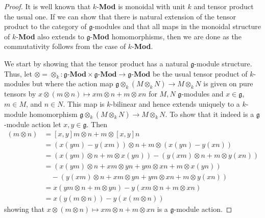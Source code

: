 \begin{proof}
  It is well known that $ k $-\textbf{Mod} is monoidal with unit $ k $ and tensor product the usual one. If we can show that there is natural extension of the tensor product to the category of $ \mathfrak{g} $-modules and that all maps in the monoidal structure of $ k $-\textbf{Mod} also extends to $ \mathfrak{g} $-\textbf{Mod} homomorphisms, then we are done as the commutativity follows from the case of $ k $-\textbf{Mod}.

  We start by showing that the tensor product has a natural $ \mathfrak{g} $-module structure. Thus, let $ \otimes = \otimes_k:\mathfrak{g}\text{-}\mathbf{Mod} \times \mathfrak{g}\text{-}\mathbf{Mod} \to \mathfrak{g}\text{-}\mathbf{Mod} $ be the usual tensor product of $ k $-modules but where the action map $ \mathfrak{g} \otimes_k (M \otimes_k N) \to M \otimes_k N $ is given on pure tensors by $ x \otimes (m \otimes n) \mapsto xm \otimes n + m \otimes xn $ for $ M,N $ $ \mathfrak{g} $-modules and $ x \in \mathfrak{g} $, $ m \in M $, and $ n \in N $. This map is $ k $-bilinear and hence extends uniquely to a $ k $-module homomorphism $ \mathfrak{g} \otimes_k (M \otimes_k N) \to M \otimes_k N $. To show that it indeed is a $ \mathfrak{g} $-module action let $ x,y \in \mathfrak{g} $. Then
  \begin{align*}
    [x,y](m \otimes n) &= [x,y]m \otimes n + m \otimes [x,y]n \\
                       &= (x(ym) - y(xm)) \otimes n + m \otimes (x(yn) - y(xn)) \\
                       &= (x(ym) \otimes n + m \otimes x(yn)) - (y(xm) \otimes n + m \otimes y(xn)) \\
                       &= (x(ym) \otimes n + xm \otimes yn + ym \otimes xn + m \otimes x(yn)) \\
                       &\quad -(y(xm) \otimes n + xm \otimes yn + ym \otimes xn + m \otimes y(xn)) \\
                       &= x(ym \otimes n + m \otimes yn) - y(xm \otimes n + m \otimes xn) \\
                       &= x(y(m \otimes n)) - y(x(m \otimes n))
  \end{align*}
  showing that $ x \otimes (m \otimes n) \mapsto xm \otimes n + m \otimes xn $ is a $\mathfrak{g}$-module action.


\end{proof}
